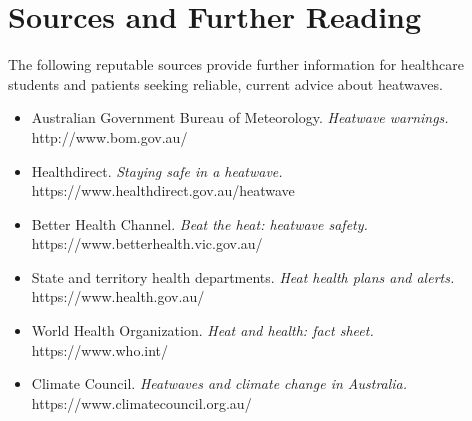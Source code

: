 \section*{Sources and Further Reading}
The following reputable sources provide further information for healthcare students and patients seeking reliable, current advice about heatwaves.

\begin{itemize}
    \item Australian Government Bureau of Meteorology. \textit{Heatwave warnings.} http://www.bom.gov.au/
    \item Healthdirect. \textit{Staying safe in a heatwave.} https://www.healthdirect.gov.au/heatwave
    \item Better Health Channel. \textit{Beat the heat: heatwave safety.} https://www.betterhealth.vic.gov.au/
    \item State and territory health departments. \textit{Heat health plans and alerts.} https://www.health.gov.au/
    \item World Health Organization. \textit{Heat and health: fact sheet.} https://www.who.int/
    \item Climate Council. \textit{Heatwaves and climate change in Australia.} https://www.climatecouncil.org.au/
\end{itemize}
